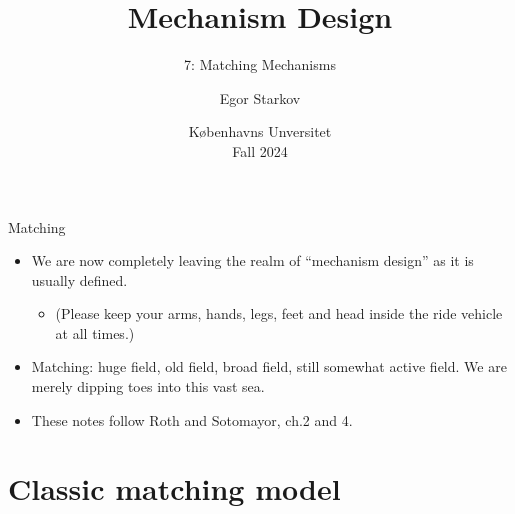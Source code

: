 \documentclass[english,10pt
,aspectratio=169
]{beamer}
\title{Mechanism Design}
\subtitle{7: Matching Mechanisms}
\author{Egor Starkov}
\date{K{\o}benhavns Unversitet \\
	Fall 2024}
\begin{document}
	\frame[plain]{\titlepage}


\begin{frame}{Matching}
\begin{itemize}
	\item We are now completely leaving the realm of ``mechanism design'' as it is usually defined.
	\begin{itemize}
		\item (Please keep your arms, hands, legs, feet and head inside the ride vehicle at all times.)
	\end{itemize}
	\item Matching: huge field, old field, broad field, still somewhat active field. We are merely dipping toes into this vast sea.
	\item These notes follow Roth and Sotomayor, ch.2 and 4.
\end{itemize}
\end{frame}


\section{Classic matching model}
\end{document}
